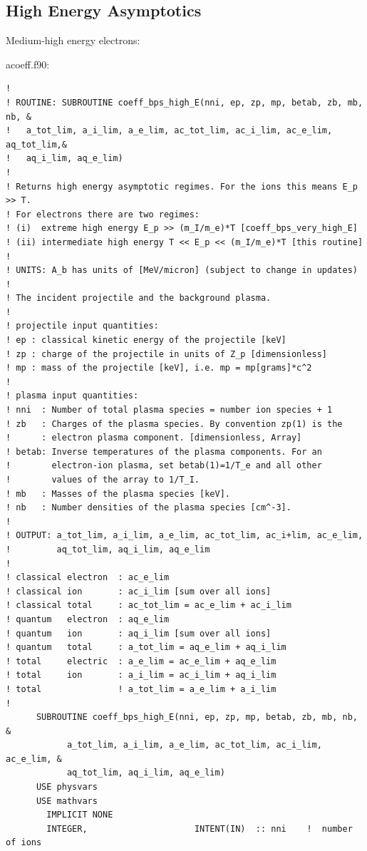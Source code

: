 \documentclass[preprint,12pt,eqsecnum,nofootinbib,amsmath,amssymb]{revtex4}
\begin{document}
{\subsection{High Energy Asymptotics}

\noindent
Medium-high energy electrons:

\vskip1cm
\noindent
acoeff.f90:
{
\baselineskip 10pt
\begin{verbatim}
! 
! ROUTINE: SUBROUTINE coeff_bps_high_E(nni, ep, zp, mp, betab, zb, mb, nb, &
!   a_tot_lim, a_i_lim, a_e_lim, ac_tot_lim, ac_i_lim, ac_e_lim, aq_tot_lim,&
!   aq_i_lim, aq_e_lim)
!
! Returns high energy asymptotic regimes. For the ions this means E_p >> T.
! For electrons there are two regimes: 
! (i)  extreme high energy E_p >> (m_I/m_e)*T [coeff_bps_very_high_E]
! (ii) intermediate high energy T << E_p << (m_I/m_e)*T [this routine]
!
! UNITS: A_b has units of [MeV/micron] (subject to change in updates)
!
! The incident projectile and the background plasma. 
!
! projectile input quantities:
! ep : classical kinetic energy of the projectile [keV]
! zp : charge of the projectile in units of Z_p [dimensionless]
! mp : mass of the projectile [keV], i.e. mp = mp[grams]*c^2
!
! plasma input quantities:
! nni  : Number of total plasma species = number ion species + 1
! zb   : Charges of the plasma species. By convention zp(1) is the 
!      : electron plasma component. [dimensionless, Array]
! betab: Inverse temperatures of the plasma components. For an
!        electron-ion plasma, set betab(1)=1/T_e and all other
!        values of the array to 1/T_I.
! mb   : Masses of the plasma species [keV]. 
! nb   : Number densities of the plasma species [cm^-3]. 
!
! OUTPUT: a_tot_lim, a_i_lim, a_e_lim, ac_tot_lim, ac_i+lim, ac_e_lim, 
!         aq_tot_lim, aq_i_lim, aq_e_lim
!
! classical electron  : ac_e_lim
! classical ion       : ac_i_lim [sum over all ions]
! classical total     : ac_tot_lim = ac_e_lim + ac_i_lim 
! quantum   electron  : aq_e_lim
! quantum   ion       : aq_i_lim [sum over all ions]
! quantum   total     : a_tot_lim = aq_e_lim + aq_i_lim
! total     electric  : a_e_lim = ac_e_lim + aq_e_lim
! total     ion       : a_i_lim = ac_i_lim + aq_i_lim
! total               ! a_tot_lim = a_e_lim + a_i_lim
!
      SUBROUTINE coeff_bps_high_E(nni, ep, zp, mp, betab, zb, mb, nb,    &
            a_tot_lim, a_i_lim, a_e_lim, ac_tot_lim, ac_i_lim, ac_e_lim, &
            aq_tot_lim, aq_i_lim, aq_e_lim)
      USE physvars
      USE mathvars      
        IMPLICIT NONE
        INTEGER,                     INTENT(IN)  :: nni    !  number of ions

\end{verbatim}}}
\end{document}
